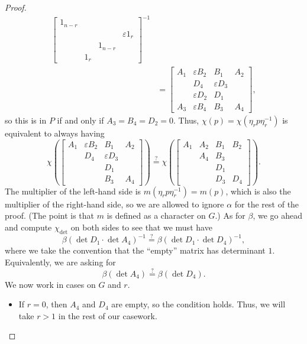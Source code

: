 \begin{proof}
\begin{align*}
\begin{bmatrix}
            1_{n-r} \\
            &&& \varepsilon 1_{r} \\
            && 1_{n-r} \\
            & 1_{r}
        \end{bmatrix}^{-1} \\
        &= \begin{bmatrix}
            A_1 & \varepsilon B_2 &  B_1 & A_2 \\
                &  D_4 & \varepsilon D_3 \\
                & \varepsilon D_2 &  D_1 \\
            A_3 & \varepsilon B_4 &  B_3 & A_4
        \end{bmatrix},
    \end{align*}
    so this is in $P$ if and only if $A_3=B_4=D_2=0$. Thus, $\chi(p)=\chi\left(\eta_rp\eta_r^{-1}\right)$ is equivalent to always having
    \[\chi\left(\begin{bmatrix}
        A_1 & \varepsilon B_2 &  B_1 & A_2 \\
            &  D_4 & \varepsilon D_3 \\
            &      &  D_1 \\
            &      &  B_3 & A_4
    \end{bmatrix}\right)\stackrel?=\chi\left(\begin{bmatrix}
        A_1 & A_2 & B_1 & B_2 \\
            & A_4 & B_3 &     \\
            &     & D_1 &     \\
            &     & D_3 & D_4
    \end{bmatrix}\right).\]
    The multiplier of the left-hand side is $m\left(\eta_rp\eta_r^{-1}\right)=m(p)$, which is also the multiplier of the right-hand side, so we are allowed to ignore $\alpha$ for the rest of the proof. (The point is that $m$ is defined as a character on $G$.) As for $\beta$, we go ahead and compute $\chi_{\det}$ on both sides to see that we must have
    \[\beta(\det D_1\cdot\det A_4)^{-1}\stackrel?=\beta(\det D_1\cdot\det D_4)^{-1},\]
    where we take the convention that the ``empty'' matrix has determinant $1$. Equivalently, we are asking for
    \[\beta(\det A_4)\stackrel?=\beta(\det D_4).\]
    We now work in cases on $G$ and $r$.
    \begin{itemize}
        \item If $r=0$, then $A_4$ and $D_4$ are empty, so the condition holds. Thus, we will take $r>1$ in the rest of our casework.

\end{itemize}
\end{proof}
